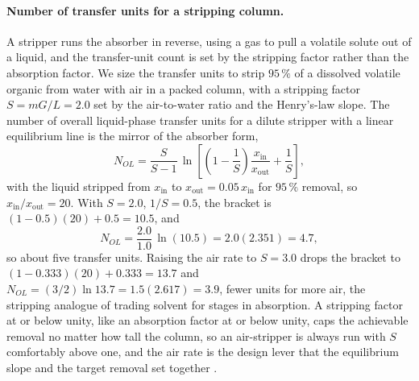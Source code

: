 \paragraph{Number of transfer units for a stripping column.} A stripper runs
the absorber in reverse, using a gas to pull a volatile solute out of a
liquid, and the transfer-unit count is set by the stripping factor rather than
the absorption factor. We size the transfer units to strip $95\,\%$ of a
dissolved volatile organic from water with air in a packed column, with a
stripping factor $S = mG/L = 2.0$ set by the air-to-water ratio and the
Henry's-law slope. The number of overall liquid-phase transfer units for a
dilute stripper with a linear equilibrium line is the mirror of the absorber
form,
\[
N_{OL} = \frac{S}{S - 1}\,\ln\!\left[\left(1 - \frac{1}{S}\right)
\frac{x_{\text{in}}}{x_{\text{out}}} + \frac{1}{S}\right],
\]
with the liquid stripped from $x_{\text{in}}$ to $x_{\text{out}} =
0.05\,x_{\text{in}}$ for $95\,\%$ removal, so $x_{\text{in}}/x_{\text{out}} =
20$. With $S = 2.0$, $1/S = 0.5$, the bracket is $(1 - 0.5)(20) + 0.5 =
10.5$, and
\[
N_{OL} = \frac{2.0}{1.0}\,\ln(10.5) = 2.0(2.351) = 4.7,
\]
so about five transfer units. Raising the air rate to $S = 3.0$ drops the
bracket to $(1 - 0.333)(20) + 0.333 = 13.7$ and $N_{OL} = (3/2)\ln 13.7 =
1.5(2.617) = 3.9$, fewer units for more air, the stripping analogue of trading
solvent for stages in absorption. A stripping factor at or below unity, like
an absorption factor at or below unity, caps the achievable removal no matter
how tall the column, so an air-stripper is always run with $S$ comfortably
above one, and the air rate is the design lever that the equilibrium slope and
the target removal set together \cite{text:treybal-mass-transfer}.

